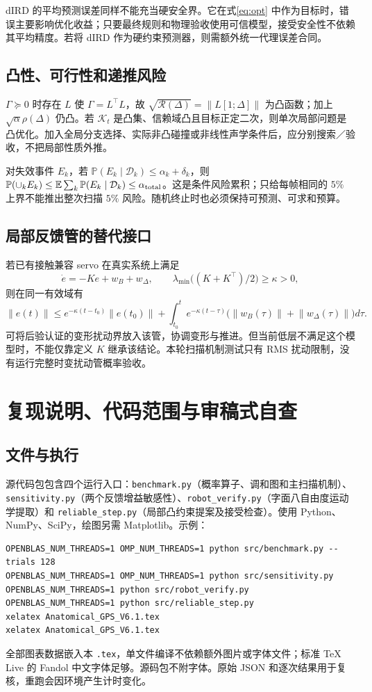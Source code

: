 \documentclass[UTF8,11pt,a4paper,fontset=fandol]{ctexart}
\numberwithin{equation}{section}
\theoremstyle{definition}
\newcommand{\E}{\mathbb E}
\newcommand{\Prob}{\mathbb P}
\newcommand{\D}{\mathcal D}
\newcommand{\norm}[1]{\left\lVert#1\right\rVert}
\begin{document}
dIRD 的平均预测误差同样不能充当硬安全界。它在式\eqref{eq:opt} 中作为目标时，错误主要影响优化收益；只要最终规则和物理验收使用可信模型，接受安全性不依赖其平均精度。若将 dIRD 作为硬约束预测器，则需额外统一代理误差合同。

\subsection{凸性、可行性和递推风险}
$\Gamma\succeq0$ 时存在 $L$ 使 $\Gamma=L^\top L$，故 $\sqrt{\mathcal R(\Delta)}=\norm{L[1;\Delta]}$ 为凸函数；加上 $\sqrt\alpha\rho(\Delta)$ 仍凸。若 $\mathcal K_t$ 是凸集、信赖域凸且目标正定二次，则单次局部问题是凸优化。加入全局分支选择、实际非凸碰撞或非线性声学条件后，应分别搜索／验收，不把局部性质外推。

对失效事件 $E_k$，若 $\Prob(E_k\mid\D_k)\le\alpha_k+\delta_k$，则
$\Prob(\cup_k E_k)\le\E\sum_k\Prob(E_k\mid\D_k)\le\alpha_{\rm total}$。这是条件风险累积；只给每帧相同的 $5\%$ 上界不能推出整次扫描 $5\%$ 风险。随机终止时也必须保持可预测、可求和预算。

\subsection{局部反馈管的替代接口}
若已有接触兼容 servo 在真实系统上满足
\[
 \dot e=-Ke+w_B+w_\Delta,\qquad
 \lambda_{\min}\big((K+K^\top)/2\big)\ge\kappa>0,
\]
则在同一有效域有
\begin{equation}
 \norm{e(t)}\le e^{-\kappa(t-t_0)}\norm{e(t_0)}+
 \int_{t_0}^t e^{-\kappa(t-\tau)}
       \big(\norm{w_B(\tau)}+\norm{w_\Delta(\tau)}\big)d\tau.
 \label{eq:tube}
\end{equation}
可将后验认证的变形扰动界放入该管，协调变形与推进。但当前低层不满足这个模型时，不能仅靠定义 $K$ 继承该结论。本轮扫描机制测试只有 RMS 扰动限制，没有运行完整时变扰动管概率验收。

\section{复现说明、代码范围与审稿式自查}
\label{app:reproduce}
\subsection{文件与执行}
源代码包包含四个运行入口：\texttt{benchmark.py}（概率算子、调和图和主扫描机制）、\texttt{sensitivity.py}（两个反馈增益敏感性）、\texttt{robot\_verify.py}（字面八自由度运动学提取）和 \texttt{reliable\_step.py}（局部凸约束提案及接受检查）。使用 Python、NumPy、SciPy，绘图另需 Matplotlib。示例：
\begin{verbatim}
OPENBLAS_NUM_THREADS=1 OMP_NUM_THREADS=1 python src/benchmark.py --trials 128
OPENBLAS_NUM_THREADS=1 OMP_NUM_THREADS=1 python src/sensitivity.py
OPENBLAS_NUM_THREADS=1 python src/robot_verify.py
OPENBLAS_NUM_THREADS=1 python src/reliable_step.py
xelatex Anatomical_GPS_V6.1.tex
xelatex Anatomical_GPS_V6.1.tex
\end{verbatim}
全部图表数据嵌入本 \texttt{.tex}，单文件编译不依赖额外图片或字体文件；标准 TeX Live 的 Fandol 中文字体足够。源码包不附字体。原始 JSON 和逐次结果用于复核，重跑会因环境产生计时变化。
\end{document}
